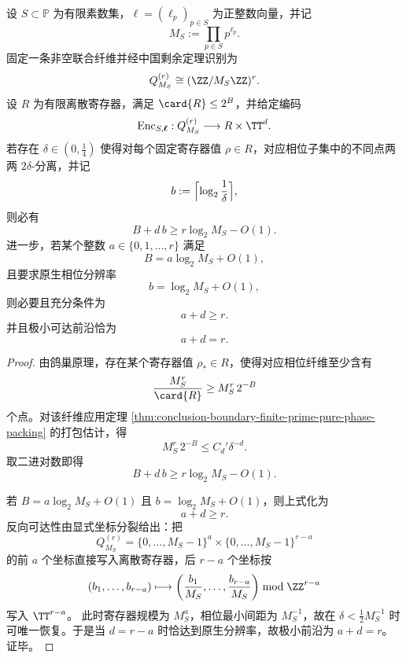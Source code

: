 \begin{theorem}\label{thm:conclusion-boundary-finite-prime-mixed-pareto-frontier}
设 \(S\subset \mathbb P\) 为有限素数集，\(\boldsymbol\ell=(\ell_p)_{p\in S}\) 为正整数向量，并记
\[
M_S:=\prod_{p\in S}p^{\ell_p}.
\]
固定一条非空联合纤维并经中国剩余定理识别为
\[
Q_{M_S}^{(r)}\cong (\ZZ/M_S\ZZ)^r.
\]
设 \(R\) 为有限离散寄存器，满足 \(\card{R}\le 2^B\)，并给定编码
\[
\mathrm{Enc}_{S,\boldsymbol\ell}:Q_{M_S}^{(r)}\longrightarrow R\times \TT^d.
\]
若存在 \(\delta\in(0,\tfrac14)\) 使得对每个固定寄存器值 \(\rho\in R\)，对应相位子集中的不同点两两 \(2\delta\)-分离，并记
\[
b:=\Bigl\lceil \log_2\frac{1}{\delta}\Bigr\rceil,
\]
则必有
\[
\boxed{\;
B+d\,b\ge r\log_2 M_S-O(1).
\;}
\]
进一步，若某个整数 \(a\in\{0,1,\dots,r\}\) 满足
\[
B=a\log_2 M_S+O(1),
\]
且要求原生相位分辨率
\[
b=\log_2 M_S+O(1),
\]
则必要且充分条件为
\[
a+d\ge r.
\]
并且极小可达前沿恰为
\[
\boxed{\;a+d=r.\;}
\]
\end{theorem}
\begin{proof}
由鸽巢原理，存在某个寄存器值 \(\rho_\ast\in R\)，使得对应相位纤维至少含有
\[
\frac{M_S^r}{\card{R}}
\ge
M_S^r\,2^{-B}
\]
个点。对该纤维应用定理 \ref{thm:conclusion-boundary-finite-prime-pure-phase-packing} 的打包估计，得
\[
M_S^r\,2^{-B}\le C_d'\delta^{-d}.
\]
取二进对数即得
\[
B+d\,b\ge r\log_2 M_S-O(1).
\]

若 \(B=a\log_2 M_S+O(1)\) 且 \(b=\log_2 M_S+O(1)\)，则上式化为
\[
a+d\ge r.
\]
反向可达性由显式坐标分裂给出：把
\[
Q_{M_S}^{(r)}=\{0,\dots,M_S-1\}^{a}\times \{0,\dots,M_S-1\}^{r-a}
\]
的前 \(a\) 个坐标直接写入离散寄存器，后 \(r-a\) 个坐标按
\[
(b_1,\dots,b_{r-a})\longmapsto
\left(\frac{b_1}{M_S},\dots,\frac{b_{r-a}}{M_S}\right)\bmod \ZZ^{r-a}
\]
写入 \(\TT^{r-a}\)。
此时寄存器规模为 \(M_S^a\)，相位最小间距为 \(M_S^{-1}\)，故在 \(\delta<\tfrac12 M_S^{-1}\) 时可唯一恢复。于是当 \(d=r-a\) 时恰达到原生分辨率，故极小前沿为 \(a+d=r\)。证毕。
\end{proof}

